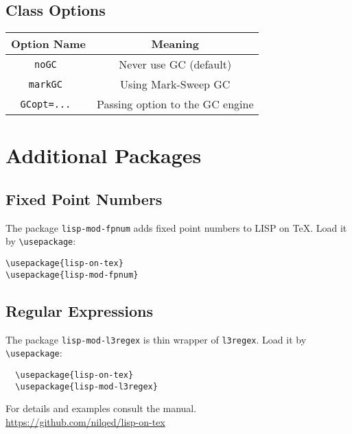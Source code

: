 \documentclass[a4paper,landscape,columns=3]{cheatsheet}
\newcommand{\pT}[1]{\texttt{\textbackslash #1}}
\begin{document}
\subsection{Class Options}
\begin{tabular}{|c|c|}
\hline 
Option Name & Meaning \\ 
\hline\hline 
\tt{noGC} & Never use GC (default) \\ 
\hline 
\tt{markGC} & Using Mark-Sweep GC \\ 
\hline 
\tt{GCopt=...} & Passing option to the GC engine \\ 
\hline 
\end{tabular} 
%
%
\section{Additional Packages}
\subsection{Fixed Point Numbers}
The package \texttt{lisp-mod-fpnum} adds fixed point numbers to LISP on \TeX. 
Load it by \pT{usepackage}:

\begin{verbatim}
\usepackage{lisp-on-tex}
\usepackage{lisp-mod-fpnum}
\end{verbatim}
%
\subsection{Regular Expressions}
The package \texttt{lisp-mod-l3regex} is thin wrapper of 
\texttt{l3regex}. Load it by \pT{usepackage}:

\begin{verbatim}
  \usepackage{lisp-on-tex}
  \usepackage{lisp-mod-l3regex}
\end{verbatim}

\scriptsize{For details and examples consult the manual.} \\
\scriptsize{\url{https://github.com/nilqed/lisp-on-tex}}
\end{document}
